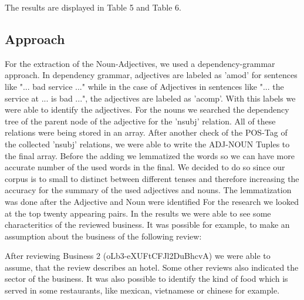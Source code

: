 The results are displayed in Table 5 and Table 6.
\subsection{Approach}
For the extraction of the Noun-Adjectives, we used a dependency-grammar approach. In dependency grammar, adjectives are labeled as 'amod' for sentences like "... bad service ..." while in the case of Adjectives in sentences like "... the service at ... is bad ...", the adjectives are labeled as 'acomp'. With this labels we were able to identify the adjectives. For the nouns we searched the dependency tree of the parent node of the adjective for 
the 'nsubj' relation. All of these relations were being stored in an array. After another check of the POS-Tag of the collected 'nsubj' relations, we were able to write the ADJ-NOUN Tuples to the final array. Before the adding we lemmatized the words so we can have more accurate number of the used words in the final. We decided to do so since our corpus is to small to distinct between different tenses and therefore increasing the accuracy for the summary of the used adjectives and nouns. The lemmatization was done after the Adjective and Noun were identified For the research we looked at the top twenty appearing pairs.
In the results we were able to see some characteritics of the reviewed business. It  was possible for example, to make an assumption about the business of the following review:

After reviewing Business 2 (oLb3-eXUFtCFJl2DuBhcvA)  we were able to assume, that the review describes an hotel. Some other reviews also indicated the sector of the business. 
It was also possible to identify the kind of food which is served in some restaurants, like mexican, vietnamese or chinese for example.
